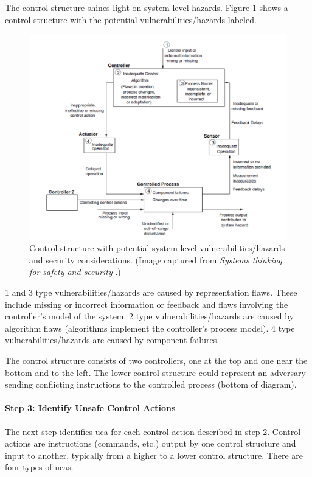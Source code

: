\documentclass[../../main/main.tex]{subfiles}
\begin{document}
The control structure shines light on system-level hazards.  Figure \ref{stpasecControlStructure} shows a control structure with the potential vulnerabilities/hazards labeled.
\begin{figure}[h]
\includegraphics[width=\linewidth]{../figures/stpasecControlStructure}
\caption{\label{stpasecControlStructure} Control structure with potential system-level vulnerabilities/hazards and security considerations. (Image captured from  \textit{Systems thinking for safety and security} \cite{sys4sec}.)}
\end{figure}

1 and 3 type vulnerabilities/hazards are caused by representation flaws.  These include missing or incorrect information or feedback and flaws involving the controller's model of the system.  2 type vulnerabilities/hazards are caused by algorithm flaws (algorithms implement the controller's process model).  4 type vulnerabilities/hazards are caused by component failures.

The control structure consists of two controllers, one at the top and one near the bottom and to the left.  The lower control structure could represent an adversary sending conflicting instructions to the controlled process (bottom of diagram).  

\paragraph*{Step 3: Identify Unsafe Control Actions}
The next step identifies \gls{uca} for each control action described in step 2. Control actions are instructions (commands, etc.) output by one control structure and input to another, typically from a higher to a lower control structure.   There are four types of \gls{uca}s.
\end{document}
